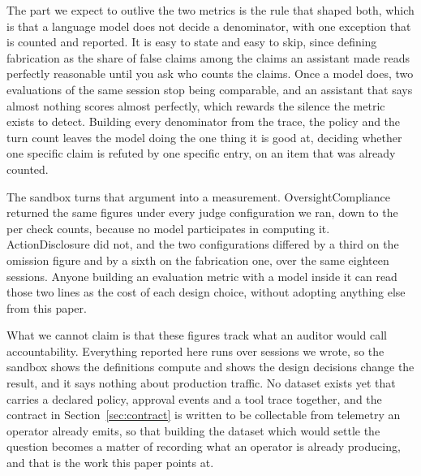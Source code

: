 \documentclass[11pt,a4paper]{article}
\begin{document}
The part we expect to outlive the two metrics is the rule that shaped both, which is
that a language model does not decide a denominator, with one exception that is
counted and reported. It is easy to state and easy to skip, since defining fabrication as the share of false claims among the claims an
assistant made reads perfectly reasonable until you ask who counts the claims. Once a
model does, two evaluations of the same session stop being comparable, and an
assistant that says almost nothing scores almost perfectly, which rewards the silence
the metric exists to detect. Building every denominator from the trace, the policy
and the turn count leaves the model doing the one thing it is good at, deciding
whether one specific claim is refuted by one specific entry, on an item that was
already counted.

The sandbox turns that argument into a measurement. OversightCompliance returned the
same figures under every judge configuration we ran, down to the per check counts,
because no model participates in computing it. ActionDisclosure did not, and the two
configurations differed by a third on the omission figure and by a sixth on the
fabrication one, over the same eighteen sessions. Anyone building an evaluation metric with a model inside it can
read those two lines as the cost of each design choice, without adopting anything else
from this paper.

What we cannot claim is that these figures track what an auditor would call
accountability. Everything reported here runs over sessions we wrote, so the sandbox
shows the definitions compute and shows the design decisions change the result, and it
says nothing about production traffic. No dataset exists yet that carries a declared
policy, approval events and a tool trace together, and the contract in
Section~\ref{sec:contract} is written to be collectable from telemetry an operator
already emits, so that building the dataset which would settle the question
becomes a matter of recording what an operator is already producing, and that is the
work this paper points at.




\end{document}
